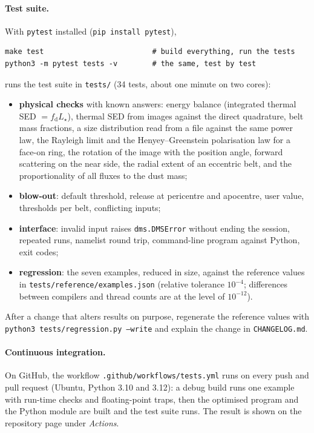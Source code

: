 \documentclass[11pt,a4paper]{article}
\newcommand{\code}[1]{\texttt{#1}}
\begin{document}
\paragraph{Test suite.} With \code{pytest} installed (\code{pip install pytest}),
\begin{lstlisting}[style=sh]
make test                         # build everything, run the tests
python3 -m pytest tests -v        # the same, test by test
\end{lstlisting}
runs the test suite in \code{tests/} (34 tests, about one minute on two cores):
\begin{itemize}
\item \textbf{physical checks} with known answers: energy balance (integrated thermal SED $=
      f_\mathrm{d}L_\star$), thermal SED from images against the direct quadrature, belt mass
      fractions, a size distribution read from a file against the same power law, the Rayleigh limit
      and the Henyey--Greenstein polarisation law for a face-on ring, the rotation of the image with
      the position angle, forward scattering on the near side, the radial extent of an eccentric
      belt, and the proportionality of all fluxes to the dust mass;
\item \textbf{blow-out}: default threshold, release at pericentre and apocentre, user value,
      thresholds per belt, conflicting inputs;
\item \textbf{interface}: invalid input raises \code{dms.DMSError} without ending the session,
      repeated runs, namelist round trip, command-line program against Python, exit codes;
\item \textbf{regression}: the seven examples, reduced in size, against the reference values in
      \code{tests/reference/examples.json} (relative tolerance $10^{-4}$; differences between
      compilers and thread counts are at the level of $10^{-12}$).
\end{itemize}
After a change that alters results on purpose, regenerate the reference values with
\code{python3 tests/regression.py --write} and explain the change in \code{CHANGELOG.md}.

\paragraph{Continuous integration.} On GitHub, the workflow \code{.github/workflows/tests.yml} runs
on every push and pull request (Ubuntu, Python 3.10 and 3.12): a debug build runs one example with
run-time checks and floating-point traps, then the optimised program and the Python module are built
and the test suite runs. The result is shown on the repository page under \emph{Actions}.
\end{document}

